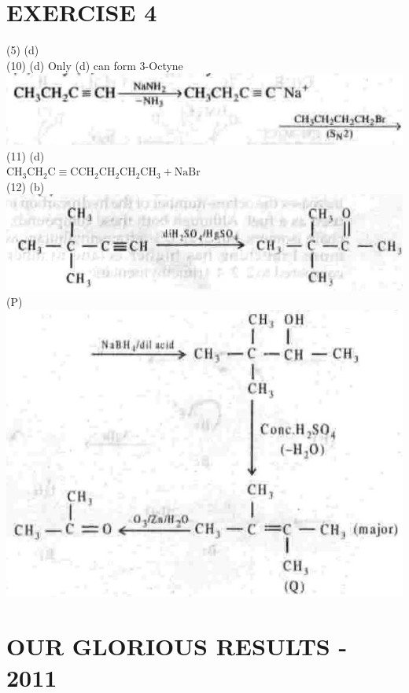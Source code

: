 \documentclass[10pt]{article}
\begin{document}
\section*{EXERCISE 4}
(5) (d)\\
(10) (d) Only (d) can form 3-Octyne\\
\includegraphics[max width=\textwidth, center]{2025_01_28_8470952b98110cec3aabg-248}\\
(11) (d)\\
$\mathrm{CH}_{3} \mathrm{CH}_{2} \mathrm{C} \equiv \mathrm{CCH}_{2} \mathrm{CH}_{2} \mathrm{CH}_{2} \mathrm{CH}_{3}+\mathrm{NaBr}$\\
(12) (b)\\
\includegraphics[max width=\textwidth, center]{2025_01_28_8470952b98110cec3aabg-248(4)}\\
(P)\\
\includegraphics[max width=\textwidth, center]{2025_01_28_8470952b98110cec3aabg-248(7)}

\section*{OUR GLORIOUS RESULTS - 2011}
\end{document}
